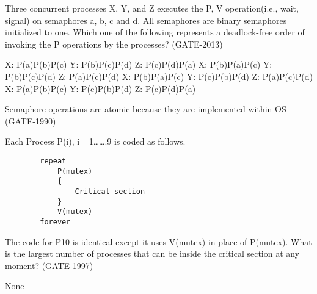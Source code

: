 \begin{minipage}{\linewidth}

  \question Three concurrent processes X, Y, and Z  executes the P, V operation(i.e., wait, signal)
            on semaphores a, b, c and d. All semaphores are binary semaphores initialized to one.
            Which one of the following represents a deadlock-free order of invoking the P operations
            by the processes? (GATE-2013)

  \begin{choices}
    \choice X: P(a)P(b)P(c) \qquad  Y: P(b)P(c)P(d) \qquad  Z: P(c)P(d)P(a)
    \choice X: P(b)P(a)P(c) \qquad  Y: P(b)P(c)P(d) \qquad  Z: P(a)P(c)P(d)
    \choice X: P(b)P(a)P(c) \qquad  Y: P(c)P(b)P(d) \qquad  Z: P(a)P(c)P(d)
    \choice X: P(a)P(b)P(c) \qquad  Y: P(c)P(b)P(d) \qquad  Z: P(c)P(d)P(a)
  \end{choices}

  \end{minipage}

\vspace{0.08in}


\begin{minipage}{\linewidth}

  \question  Semaphore operations are atomic because they are implemented within OS \fillin[] (GATE-1990)

  \end{minipage}

\vspace{0.08in}


\begin{minipage}{\linewidth}

  \question  Each Process P(i), i= 1…….9 is coded as follows.
    \begin{lstlisting}
        repeat
            P(mutex)
            {
                Critical section
            }
            V(mutex)
        forever
    \end{lstlisting}
    The code for P10 is identical except it uses V(mutex) in place of P(mutex). What is the largest number of processes that can be inside the critical section at any moment? (GATE-1997)

  \begin{oneparchoices}
    \choice None
  \end{oneparchoices}

  \end{minipage}

